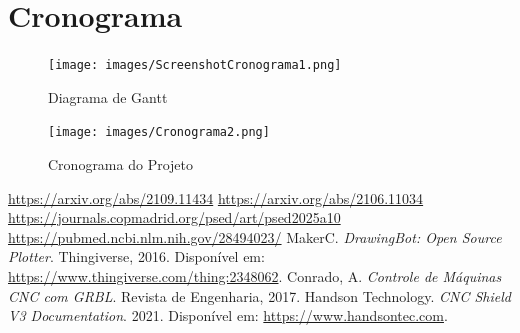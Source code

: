 \documentclass[a4paper,12pt]{article}
\begin{document}
\section{Cronograma}  
\begin{figure}[H]  
    \centering  
    \texttt{[image: images/ScreenshotCronograma1.png]}   
    \caption{Diagrama de Gantt}  
    \label{fig:cronograma_gantt}  
\end{figure}  

\vspace{1em}  

\begin{figure}[H]  
    \centering  
    \texttt{[image: images/Cronograma2.png]}   
    \caption{Cronograma do Projeto}  
    \label{fig:cronograma_projeto}  
\end{figure}  

\vspace{1em}  

\begin{thebibliography}{9}  
 \href{https://arxiv.org/abs/2109.11434}{https://arxiv.org/abs/2109.11434}  
 \href{https://arxiv.org/abs/2106.11034}{https://arxiv.org/abs/2106.11034}  
 \href{https://journals.copmadrid.org/psed/art/psed2025a10}{https://journals.copmadrid.org/psed/art/psed2025a10}  
 \href{https://pubmed.ncbi.nlm.nih.gov/28494023/}{https://pubmed.ncbi.nlm.nih.gov/28494023/}  
 MakerC. \textit{DrawingBot: Open Source Plotter}. Thingiverse, 2016. Disponível em: \url{https://www.thingiverse.com/thing:2348062}.  
 Conrado, A. \textit{Controle de Máquinas CNC com GRBL}. Revista de Engenharia, 2017.  
 Handson Technology. \textit{CNC Shield V3 Documentation}. 2021. Disponível em: \url{https://www.handsontec.com}.  
\end{thebibliography}  
\end{document}
